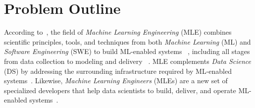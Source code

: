 


  \section{Problem Outline}
  \label{sec:problem_outline}

  According to~\citeauthor{Burkov2020MachineEngineering}, the field of
  \emph{Machine Learning Engineering} (MLE) combines scientific principles,
  tools, and techniques from both \emph{Machine Learning} (ML) and
  \emph{Software Engineering} (SWE) to build ML-enabled systems%
  ~\parencite{Burkov2020MachineEngineering},
  including all stages from data collection to modeling and delivery%
  ~\parencite{Amershi2019SoftwareStudy,Burkov2020MachineEngineering,
  Hilllaz2016TrialsStudy}.
  MLE complements \emph{Data Science} (DS) by addressing the surrounding
  infrastructure required by ML-enabled systems~\parencite{Nahar2021MoreProjects}.
  Likewise, \emph{Machine Learning Engineers} (MLEs) are a new set of
  specialized developers that help data scientists to build, deliver,
  and operate ML-enabled systems~\parencite{Burkov2020MachineEngineering,
  Hilllaz2016TrialsStudy, Kreuzberger2023MachineArchitecture}.

